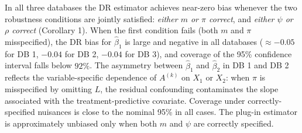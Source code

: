 In all three databases the DR estimator achieves near-zero bias whenever
the two robustness conditions are jointly satisfied:
\emph{either $m$ or $\pi$ correct}, and \emph{either $\psi$ or $\rho$ correct}
(Corollary 1).
When the first condition fails (both $m$ and $\pi$ misspecified), the DR bias
for $\hat\beta_1$ is large and negative in all databases
($\approx {-0.05}$ for DB 1, ${-0.04}$ for DB 2, ${-0.04}$ for DB 3),
and coverage of the 95\% confidence interval falls below $92\%$.
The asymmetry between $\hat\beta_1$ and $\hat\beta_2$ in DB 1 and DB 2
reflects the variable-specific dependence of $A^{(k)}$ on $X_1$ or $X_2$:
when $\pi$ is misspecified by omitting $L$, the residual confounding
contaminates the slope associated with the treatment-predictive covariate.
Coverage under correctly-specified nuisances is close to the nominal 95\%
in all cases.
The plug-in estimator is approximately unbiased only when both $m$ and $\psi$
are correctly specified.

